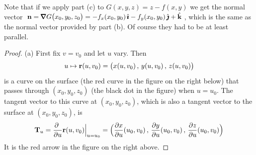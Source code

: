 Note that if we apply part (c) to $G(x,y,z) = z - f(x,y)$ we get
the normal vector $\vn=\vnabla G\big(x_0,y_0,z_0\big)
   =-f_x(x_0,y_0)\,\hi - f_y(x_0,y_0)\,\hj + \hk$, which is the same as the
normal vector provided by part (b). Of course they had to be at least 
parallel.

\begin{proof} (a)
First fix $v=v_0$ and let $u$ vary. Then
\begin{equation*}
u\mapsto \mathbf{r}(u,v_0) = \big(x(u,v_0)\,,\,y(u,v_0)\,,\,z(u,v_0)\big)
\end{equation*}
is a curve on the surface (the red curve in the figure on the right below) that
passes through $(x_0,y_0,z_0)$ (the black dot in the figure) when $u=u_0$.
The tangent vector to this curve at  $(x_0,y_0,z_0)$,
which is also a tangent vector to the surface at $(x_0,y_0,z_0)$,
is
\begin{equation*}
\mathbf{T}_u = \frac{\partial\ }{\partial u}\mathbf{r}(u,v_0)\Big|_{u=u_0}
=\Big(\frac{\partial x}{\partial u}(u_0,v_0)\,,\,
      \frac{\partial y}{\partial u}(u_0,v_0)\,,\,
      \frac{\partial z}{\partial u}(u_0,v_0)\Big)
\end{equation*}
It is the red arrow in the figure on the right above.


\end{proof}
